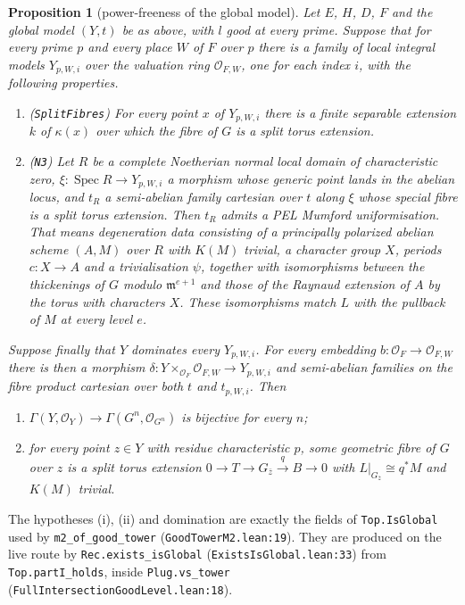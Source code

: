 \documentclass[11pt]{article}
\newcommand{\lean}[1]{\nolinkurl{#1}}
\newcommand{\Lpath}[1]{\nolinkurl{#1}}
\newtheorem{proposition}{Proposition}
\theoremstyle{remark}
\begin{document}
\begin{proposition}[power-freeness of the global model]\label{prop:A}
Let $E$, $H$, $D$, $F$ and the global model $(Y,t)$ be as above, with $l$ good at every prime. Suppose that for every prime $p$ and every place $W$ of $F$ over $p$ there is a family of local integral models $Y_{p,W,i}$ over the valuation ring $\mathcal O_{F,W}$, one for each index $i$, with the following properties.
\begin{enumerate}[label=(\roman*)]
\item (\lean{SplitFibres}) For every point $x$ of $Y_{p,W,i}$ there is a finite separable extension $k$ of $\kappa(x)$ over which the fibre of $G$ is a split torus extension.
\item (\lean{N3}) Let $R$ be a complete Noetherian normal local domain of characteristic zero, $\xi\colon\operatorname{Spec}R\to Y_{p,W,i}$ a morphism whose generic point lands in the abelian locus, and $t_R$ a semi-abelian family cartesian over $t$ along $\xi$ whose special fibre is a split torus extension. Then $t_R$ admits a PEL Mumford uniformisation. That means degeneration data consisting of a principally polarized abelian scheme $(A,M)$ over $R$ with $K(M)$ trivial, a character group $X$, periods $c\colon X\to A$ and a trivialisation $\psi$, together with isomorphisms between the thickenings of $G$ modulo $\mathfrak m^{e+1}$ and those of the Raynaud extension of $A$ by the torus with characters $X$. These isomorphisms match $L$ with the pullback of $M$ at every level $e$.
\end{enumerate}
Suppose finally that $Y$ dominates every $Y_{p,W,i}$. For every embedding $b\colon\mathcal O_F\to\mathcal O_{F,W}$ there is then a morphism $\delta\colon Y\times_{\mathcal O_F}\mathcal O_{F,W}\to Y_{p,W,i}$ and semi-abelian families on the fibre product cartesian over both $t$ and $t_{p,W,i}$. Then
\begin{enumerate}[label=(\alph*)]
\item $\Gamma(Y,\mathcal O_Y)\to\Gamma(G^n,\mathcal O_{G^n})$ is bijective for every $n$;
\item for every point $z\in Y$ with residue characteristic $p$, some geometric fibre of $G$ over $z$ is a split torus extension $0\to T\to G_{\bar z}\xrightarrow{q}B\to0$ with $L|_{G_{\bar z}}\cong q^*M$ and $K(M)$ trivial.
\end{enumerate}
\end{proposition}

The hypotheses (i), (ii) and domination are exactly the fields of \lean{Top.IsGlobal} used by \lean{m2_of_good_tower} (\Lpath{GoodTowerM2.lean:19}). They are produced on the live route by \lean{Rec.exists_isGlobal} (\Lpath{ExistsIsGlobal.lean:33}) from \lean{Top.partI_holds}, inside \lean{Plug.vs_tower} (\Lpath{FullIntersectionGoodLevel.lean:18}).
\end{document}
